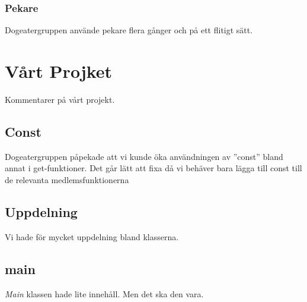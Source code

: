 \documentclass[12pt]{TDP005mall}
\begin{document}
\subsubsection{Pekare}
Dogeatergruppen använde pekare flera gånger och på ett flitigt sätt. 


\section{Vårt Projket}
Kommentarer på vårt projekt.

\subsection{Const}
Dogeatergruppen påpekade att vi kunde öka användningen av ''const'' bland annat i get-funktioner. Det går lätt att fixa då vi behäver bara lägga till const till de relevanta medlemsfunktionerna

\subsection{Uppdelning}
Vi hade för mycket uppdelning bland klasserna. 

\subsection{main}
\textit{Main} klassen hade lite innehåll. Men det ska den vara. 
\end{document}
